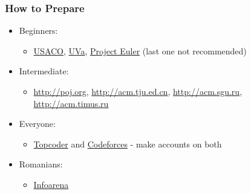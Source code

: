 \documentclass[svgnames,dvipsnames,usenames]{beamer}
\begin{document}
\begin{frame}
    \frametitle{How to Prepare}
    \begin{itemize}
            \pause
        \item Beginners:
            \begin{itemize}
                    \pause
                \item \href{http://train.usaco.org/usacogate}{USACO}, \href{http://uva.onlinejudge.org/}{UVa}, \href{http://projecteuler.com}{Project Euler} (last one not recommended)
            \end{itemize}
            \pause
        \item Intermediate:
            \begin{itemize}
                    \pause
                \item \url{http://poj.org}, \url{http://acm.tju.ed.cn}, \url{http://acm.sgu.ru}, \url{http://acm.timus.ru} 
            \end{itemize}
            \pause
        \item Everyone:
            \begin{itemize}
                    \pause
                \item \href{http://topcoder.com/tc}{Topcoder} and \href{http://codeforces.com}{Codeforces} - make accounts on both
            \end{itemize}
            \pause
        \item Romanians:
            \begin{itemize}
                    \pause
                \item \href{http://infoarena.ro}{Infoarena}
            \end{itemize}
    \end{itemize}
\end{frame}
\end{document}
